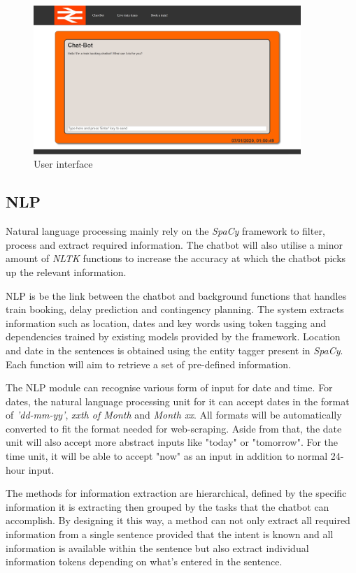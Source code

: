 \documentclass[11pt]{article}
\begin{document}
\begin{figure}[!htb]
	\centering
	\includegraphics[width=0.9\textwidth]{UI}
	\caption{User interface }\label{fig:UI}
\end{figure}

\subsection{NLP}
Natural language processing mainly rely on the \textit{SpaCy} framework to filter, process and extract required information. The chatbot will also utilise a minor amount of \textit{NLTK} functions to increase the accuracy at which the chatbot picks up the relevant information.

NLP is be the link between the chatbot and background functions that handles train booking, delay prediction and contingency planning. The system extracts information such as location, dates and key words using token tagging and dependencies trained by existing models provided by the framework. Location and date in the sentences is obtained using the entity tagger present in \textit{SpaCy}. Each function will aim to retrieve a set of pre-defined information.

The NLP module can recognise various form of input for date and time. For dates, the natural language processing unit for it can accept dates in the format of \textit{'dd-mm-yy'}, \textit{xxth of Month} and \textit{Month xx}. All formats will be automatically converted to fit the format needed for web-scraping. Aside from that, the date unit will also accept more abstract inputs like "today" or "tomorrow". For the time unit, it will be able to accept "now" as an input in addition to normal 24-hour input.

The methods for information extraction are hierarchical, defined by the specific information it is extracting then grouped by the tasks that the chatbot can accomplish. By designing it this way, a method can not only extract all required information from a single sentence provided that the intent is known and all information is available within the sentence but also extract individual information tokens depending on what's entered in the sentence.
\end{document}

